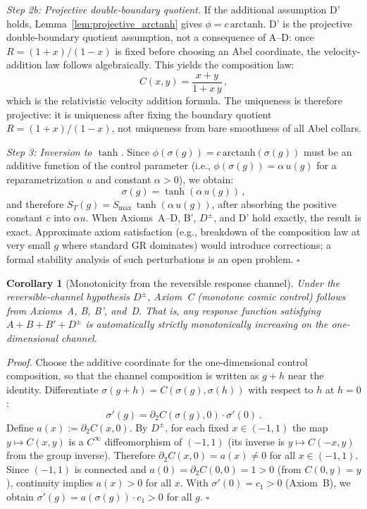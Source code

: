 \documentclass[aps,prd,twocolumn,superscriptaddress,nofootinbib]{revtex4-2}
\newtheorem{corollary}{Corollary}
\begin{document}
\textit{Step 2b: Projective double-boundary quotient.}
If the additional assumption D' holds, Lemma~\ref{lem:projective_arctanh} gives $\phi=c\,\mathrm{arctanh}$. D' is the projective double-boundary quotient assumption, not a consequence of A--D: once $R=(1+x)/(1-x)$ is fixed before choosing an Abel coordinate, the velocity-addition law follows algebraically. This yields the composition law:
\begin{equation}
C(x, y) = \frac{x + y}{1 + x\,y}\,,
\label{eq:addition_formula}
\end{equation}
which is the relativistic velocity addition formula. The uniqueness is therefore projective: it is uniqueness after fixing the boundary quotient $R=(1+x)/(1-x)$, not uniqueness from bare smoothness of all Abel collars.

\textit{Step 3: Inversion to $\tanh$.}
Since $\phi(\sigma(g)) = c\,\mathrm{arctanh}(\sigma(g))$ must be an additive function of the control parameter (i.e., $\phi(\sigma(g)) = \alpha\,u(g)$ for a reparametrization $u$ and constant $\alpha > 0$), we obtain:
\begin{equation}
\sigma(g) = \tanh(\alpha\,u(g))\,,
\end{equation}
and therefore $S_T(g) = S_{\max}\,\tanh(\alpha\,u(g))$, after absorbing the positive constant $c$ into $\alpha u$. When Axioms~A--D, B', $D^\pm$, and D' hold exactly, the result is exact. Approximate axiom satisfaction (e.g., breakdown of the composition law at very small $g$ where standard GR dominates) would introduce corrections; a formal stability analysis of such perturbations is an open problem. \hfill $\square$

\begin{corollary}[Monotonicity from the reversible response channel]
\label{cor:monotonicity}
Under the reversible-channel hypothesis $D^\pm$, Axiom~C (monotone cosmic control) follows from Axioms~A, B, B', and~D. That is, any response function satisfying $A + B + B' + D^\pm$ is automatically strictly monotonically increasing on the one-dimensional channel.
\end{corollary}

\textit{Proof.} Choose the additive coordinate for the one-dimensional control composition, so that the channel composition is written as $g+h$ near the identity. Differentiate $\sigma(g + h) = C(\sigma(g), \sigma(h))$ with respect to $h$ at $h = 0$:
\[
\sigma'(g) = \partial_2 C(\sigma(g), 0) \cdot \sigma'(0)\,.
\]
Define $a(x) := \partial_2 C(x, 0)$. By $D^\pm$, for each fixed $x \in (-1,1)$ the map $y \mapsto C(x,y)$ is a $C^\infty$ diffeomorphism of $(-1,1)$ (its inverse is $y \mapsto C(-x, y)$ from the group inverse). Therefore $\partial_2 C(x, 0) = a(x) \neq 0$ for all $x \in (-1,1)$. Since $(-1,1)$ is connected and $a(0) = \partial_2 C(0,0) = 1 > 0$ (from $C(0,y) = y$), continuity implies $a(x) > 0$ for all $x$. With $\sigma'(0) = c_1 > 0$ (Axiom~B), we obtain $\sigma'(g) = a(\sigma(g)) \cdot c_1 > 0$ for all $g$. \hfill $\square$
\end{document}
